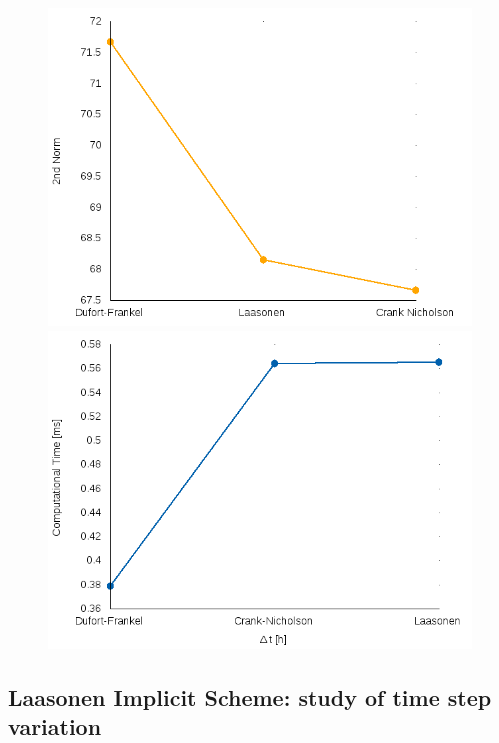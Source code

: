\documentclass[12pt]{report}
\begin{document}
\begin{figure}[!htb]
\centering
\begin{minipage}{.5\textwidth}
  \centering
  \includegraphics[width=.8\linewidth]{norms.png}
\end{minipage}%
\begin{minipage}{.5\textwidth}
  \centering
  \includegraphics[width=.8\linewidth]{default_deltat_times.png}
\end{minipage}
\end{figure}

\subsection*{Laasonen Implicit Scheme: study of time step variation}
\end{document}
